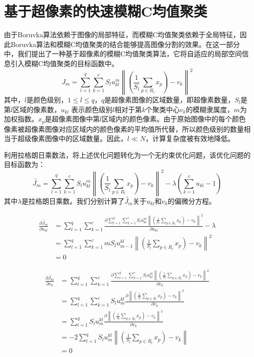 \section{基于超像素的快速模糊C均值聚类}
由于Boruvka算法依赖于图像的局部特征，而模糊C均值聚类依赖于全局特征，因此Boruvka算法和模糊C均值聚类的结合能够提高图像分割的效果。在这一部分中，我们提出了一种基于超像素的模糊C均值聚类算法，它将自适应的局部空间信息引入模糊C均值聚类的目标函数中。
\begin{equation}
J_{m} = \sum_{l=1}^{q}\sum_{k=1}^{c}S_{l}u_{kl}^{m} \left \| (\frac{1}{S_{l}}\sum_{p\in R_{l}}x_{p})-v_{k} \right \|^{2}
\end{equation}
其中，$l$是颜色级别，$1\leq l\leq q$，$q$是超像素图像的区域数量，即超像素数量，$S_{l}$是第$l$区域的像素数，$u_{kl}$ 表示颜色级别$l$相对于第$k$个聚类中心$v_{k}$的模糊隶属度，$m$为加权指数。$x_{p}$是超像素图像中第$l$区域内的颜色像素。由于原始图像中的每个颜色像素被超像素图像对应区域内的颜色像素的平均值所代替，所以颜色级别的数量相当于超级像素图像中的区域数量。因此，$l\ll N$，计算复杂度被有效地降低。

利用拉格朗日乘数法，将上述优化问题转化为一个无约束优化问题，该优化问题的目标函数为：
\begin{equation}
\widetilde{J_{m}} = \sum_{l=1}^{q}\sum_{k=1}^{c}S_{l}u_{kl}^{m} \left \| (\frac{1}{S_{l}}\sum_{p\in R_{l}}x_{p})-v_{k} \right \|^{2} - \lambda (\sum_{k=1}^{c}u_{kl}-1)
\end{equation}
其中$\lambda$是拉格朗日乘数。我们分别计算了$\widetilde{J_{m}}$关于$u_{kl}$和$v_k$的偏微分方程。

\begin{equation}
\begin{split}
\frac{\partial \widetilde{J_m}}{\partial u_{kl}}
&= \sum_{l=1}^{q}\sum_{k=1}^{c}\frac{\partial \sum_{l=1}^{q}\sum_{k=1}^{c}S_{l}u_{kl}^{m} \left \| (\frac{1}{S_{l}}\sum_{p\in R_{l}}x_{p})-v_{k} \right \|^{2}}{\partial u_{kl}}-\lambda \\
&= \sum_{l=1}^{q}\sum_{k=1}^{c}mS_{l}u_{m-1}^{kl}\left \| (\frac{1}{S_{l}}\sum_{p\in R_{l}}x_{p})-v_{k}  \right \|^{2} \\
&= 0
\end{split}
\label{eq4.4}
\end{equation}

\begin{equation}
\begin{split}
\frac{\partial \widetilde{J_m}}{\partial v_{k}}
&= \sum_{l=1}^{q}\sum_{k=1}^{c}\frac{\partial \sum_{l=1}^{q}\sum_{k=1}^{c}S_{l}u_{kl}^{m} \left \| (\frac{1}{S_{l}}\sum_{p\in R_{l}}x_{p})-v_{k} \right \|^{2}}{\partial v_{k}}  \\
&= \sum_{l=1}^{q}\sum_{k=1}^{c}S_{l}u_{m}^{kl}\frac{\partial \left \| (\frac{1}{S_{l}}\sum_{p\in R_{l}}x_{p})-v_{k}  \right \|^{2} }{\partial v_{k}} \\
&= \sum_{l=1}^{q} S_{l}u_{m}^{kl}\frac{\partial \left \| (\frac{1}{S_{l}}\sum_{p\in R_{l}}x_{p})-v_{k}  \right \|^{2} }{\partial v_{k}} \\
&= -2 \sum_{l=1}^{q} S_{l}u_{m}^{kl} \left \| (\frac{1}{S_{l}}\sum_{p\in R_{l}}x_{p})-v_{k} \right \| \\
&= 0
\end{split}
\label{eq4.5}
\end{equation}

